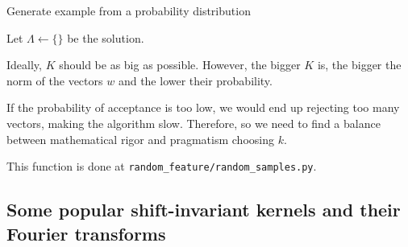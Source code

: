 \begin{algorithm}[hbt!]
    \caption{Generate example from a probability distribution }\label{alg:two}
  
        Let $\Lambda \gets \{\}$ be the solution. 
        \\
        \Return{$\Lambda$} 
    \end{algorithm}

Ideally, $K$ should be as big as  possible. 
However, the bigger $K$ is, the bigger the norm of the vectors $w$
and the lower their probability. 

If the probability of acceptance is too low, we would end up rejecting too many vectors, making the algorithm slow. Therefore, so we need to find a balance 
between mathematical rigor and pragmatism choosing $k$. 

This function is done at \texttt{random\_feature/random\_samples.py}. 


\subsection{Some popular shift-invariant kernels and their Fourier transforms}

